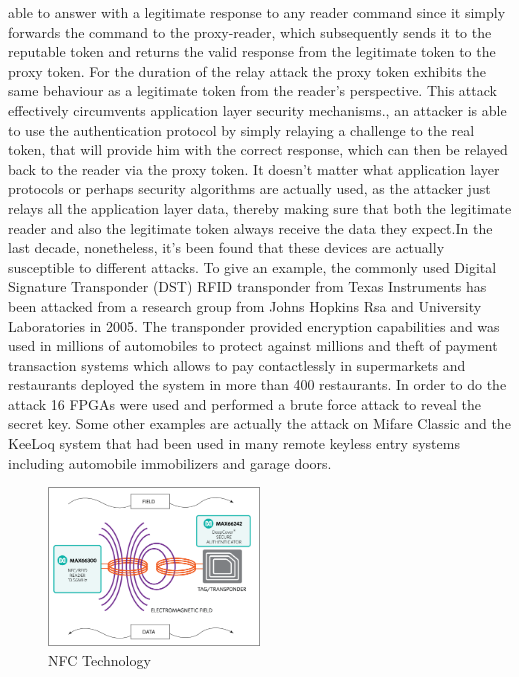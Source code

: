 \documentclass[conference]{IEEEtran}
\begin{document}
able to answer with a legitimate response to any reader command
since it simply forwards the command to the
proxy-reader, which subsequently sends it to the reputable token
and returns the valid response from the legitimate token to the proxy token. For the duration of the relay
attack the proxy token exhibits the same behaviour as a legitimate token from the reader's perspective. This
attack effectively circumvents application layer security mechanisms., an attacker is able to use the
authentication protocol by simply relaying a challenge to
the real token, that will provide him with the correct
response, which can then be relayed back to the reader via the proxy token. It doesn't matter what application
layer protocols or perhaps security algorithms are actually used, as the attacker
just relays all the application layer data, thereby
making sure that both the legitimate reader and also the legitimate token always receive the data they expect.In the last decade, nonetheless, it's been found that these devices are actually susceptible to different attacks. To give an
example, the commonly used Digital Signature Transponder
(DST) RFID transponder from Texas Instruments has
been attacked from a research group from Johns Hopkins Rsa and University Laboratories in 2005. The transponder
provided encryption capabilities and was used in millions
of automobiles to protect against millions and theft of payment transaction systems which allows to pay contactlessly
in supermarkets and restaurants deployed the system in more than 400 restaurants. In order to do the attack
16 FPGAs were used and performed a brute force attack to reveal the secret key.  Some other examples are actually the attack on Mifare
Classic and the KeeLoq system that had been used in
many remote keyless entry systems including automobile immobilizers and garage doors.
\begin{figure}[h]
\includegraphics[width=0.5\textwidth]{nfc}
\caption{NFC Technology}
\end{figure}
\end{document}

